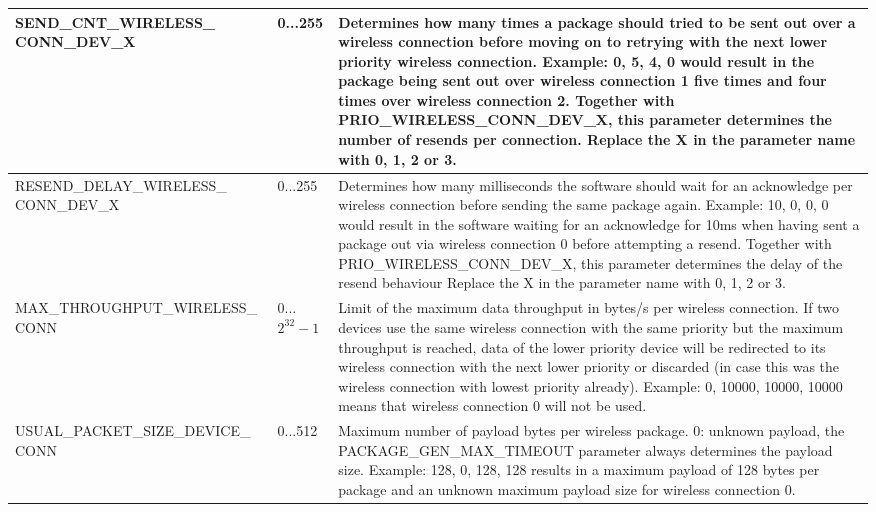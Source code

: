 \begin{center}
\begin{longtable}{p{6cm}p{1cm}p{7cm}}
            \hline
            SEND\_CNT\_WIRELESS\_ CONN\_DEV\_X &  0...255 & 
            Determines how many times a package should tried to be sent out over a wireless connection before moving on to retrying with the next lower priority wireless connection. Example: {0, 5, 4, 0} would result in the package being sent out over wireless connection 1 five times and four times over wireless connection 2. Together with PRIO\_WIRELESS\_CONN\_DEV\_X, this parameter determines the number of resends per connection. Replace the X in the parameter name with 0, 1, 2 or 3.\\
            \hline
            RESEND\_DELAY\_WIRELESS\_ CONN\_DEV\_X &  0...255 & 
            Determines how many milliseconds the software should wait for an acknowledge per wireless connection before sending the same package again. Example: {10, 0, 0, 0} would result in the software waiting for an acknowledge for 10ms when having sent a package out via wireless connection 0 before attempting a resend. Together with PRIO\_WIRELESS\_CONN\_DEV\_X, this parameter determines the delay of the resend behaviour Replace the X in the parameter name with 0, 1, 2 or 3.\\
            \hline
            MAX\_THROUGHPUT\_WIRELESS\_ CONN
             &  0...$2^{32}-1$ & 
            Limit of the maximum data throughput in bytes/s per wireless connection. If two devices use the same wireless connection with the same priority but the maximum throughput is reached, data of the lower priority device will be redirected to its wireless connection with the next lower priority or discarded (in case this was the  wireless connection with lowest priority already). Example: {0, 10000, 10000, 10000} means that wireless connection 0 will not be used.\\
            \hline
            USUAL\_PACKET\_SIZE\_DEVICE\_ CONN  &  0...512 & 
            Maximum number of payload bytes per wireless package. 0: unknown payload, the PACKAGE\_GEN\_MAX\_TIMEOUT parameter always determines the payload size. Example: {128, 0, 128, 128} results in a maximum payload of 128 bytes per package and an unknown maximum payload size for wireless connection 0.\\
            \hline

\end{longtable}
\end{center}
